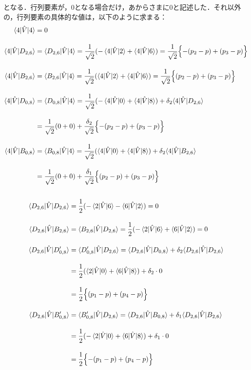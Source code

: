 となる．行列要素が，0となる場合だけ，あからさまに0と記述した．それ以外の，行列要素の具体的な値は，以下のように求まる：
\begin{align}
    \langle{4|\hat{V}|4}\rangle
    &=0\\[10pt]
    \langle{4|\hat{V}|D_{2,6}}\rangle
    &=\langle{D_{2,6}|\hat{V}|4}\rangle
    =\frac{1}{\sqrt{2}}(-\braket{4|\hat{V}|2} + \braket{4|\hat{V}|6})
    =\frac{1}{\sqrt{2}}\Bigl\{
    -(p_2-p) + (p_3-p)
    \Bigr\}\\[10pt]
    \langle{4|\hat{V}|B_{2,6}}\rangle
    &=\langle{B_{2,6}|\hat{V}|4}\rangle
    =\frac{1}{\sqrt{2}}(\braket{4|\hat{V}|2} + \braket{4|\hat{V}|6})
    =\frac{1}{\sqrt{2}}\Bigl\{
    (p_2-p) + (p_3-p)
    \Bigr\}\\[10pt]
    \langle{4|\hat{V}|D_{0,8}}\rangle
    &=\langle{D_{0,8}|\hat{V}|4}\rangle
    =\frac{1}{\sqrt{2}}(-\braket{4|\hat{V}|0} + \braket{4|\hat{V}|8})
    +\delta_2\langle{4|\hat{V}|D_{2,6}}\rangle\nn[10pt]
    &=\frac{1}{\sqrt{2}}(0+0)
    +\frac{\delta_2}{\sqrt{2}}\Bigl\{
    -(p_2-p) + (p_3-p)
    \Bigr\}\\[10pt]
   \langle{4|\hat{V}|B_{0,8}}\rangle
   &=\langle{B_{0,8}|\hat{V}|4}\rangle
   =\frac{1}{\sqrt{2}}(\braket{4|\hat{V}|0} + \braket{4|\hat{V}|8})
    +\delta_2\langle{4|\hat{V}|B_{2,6}}\rangle\nn[10pt]
    &=\frac{1}{\sqrt{2}}(0+0)
    +\frac{\delta_1}{\sqrt{2}}\Bigl\{
    (p_2-p) + (p_3-p)
    \Bigr\}\\[10pt]
\end{align}



\begin{align}
    \langle{D_{2,6}|\hat{V}|D_{2,6}}\rangle
    &
    =\frac{1}{2}(-\braket{2|\hat{V}|6} - \braket{6|\hat{V}|2})
    =0\\[10pt]
    \langle{D_{2,6}|\hat{V}|B_{2,6}}\rangle
    &=\langle{B_{2,6}|\hat{V}|D_{2,6}}\rangle
    =\frac{1}{2}(-\braket{2|\hat{V}|6} + \braket{6|\hat{V}|2})
    =0\\[10pt]
    \langle{D_{2,6}|\hat{V}|D^\prime_{0,8}}\rangle
    &=\langle{D^\prime_{0,8}|\hat{V}|D_{2,6}}\rangle
    =\braket{D_{2,6}|\hat{V}|D_{0,8}} 
    +\delta_2\langle{D_{2,6}|\hat{V}|D_{2,6}}\rangle\nn[10pt]
    &=\frac{1}{2}(\braket{2|\hat{V}|0}+\braket{6|\hat{V}|8})
    +\delta_2\cdot0\nn[10pt]
    &=\frac{1}{2}\Bigl\{
    (p_1-p) + (p_4-p)
    \Bigr\}\\[10pt]
   \langle{D_{2,6}|\hat{V}|B^\prime_{0,8}}\rangle
   &=\langle{B^\prime_{0,8}|\hat{V}|D_{2,6}}\rangle
    =\braket{D_{2,6}|\hat{V}|B_{0,8}} 
    +\delta_1\langle{D_{2,6}|\hat{V}|B_{2,6}}\rangle\nn[10pt]
    &=\frac{1}{2}(-\braket{2|\hat{V}|0}+\braket{6|\hat{V}|8})
    +\delta_1\cdot0\nn[10pt]
    &=\frac{1}{2}\Bigl\{
    -(p_1-p) + (p_4-p)
    \Bigr\}
\end{align}















